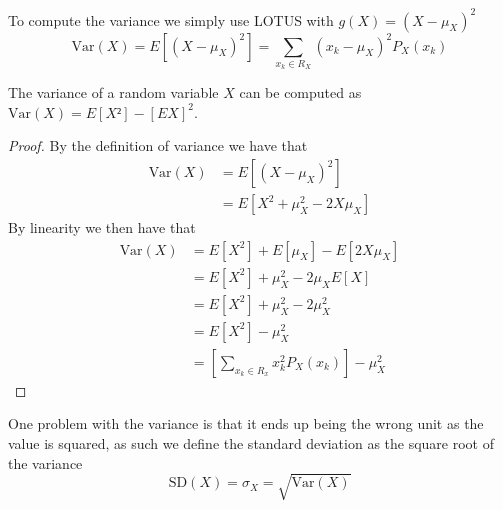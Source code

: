 To compute the variance we simply use LOTUS with $g(X)=(X-\mu_{X})^{2}$
\[
    \text{Var}(X)=E[(X-\mu_{X})^{2}]=\sum_{x_{k}\in R_{X}}(x_{k}-\mu_{X})^{2}P_{X}(x_{k})
\]
\begin{theorem}
    The variance of a random variable $X$ can be computed as $\text{Var}(X)=E[X² ]-[EX]^{2}$.
\end{theorem}
\begin{proof}
    By the definition of variance we have that
    \begin{align*}
        \text{Var}(X)&=E[(X-\mu_{X})^{2}] \\
                 &=E[X^{2}+\mu_{X}^{2}-2X\mu_{X}]
    \end{align*}
    By linearity we then have that
    \begin{align*}
        \text{Var}(X)&=E[X^{2}]+E[\mu_{X}]-E[2X\mu_{X}] \\
                 &=E[X^{2}]+\mu_{X}^{2}-2\mu_{X}E[X] \\
                 &=E[X^{2}]+\mu_{X}^{2}-2\mu_{X}^{2} \\
                 &=E[X^{2}]-\mu_{X}^{2} \\
                 &=\left[\sum_{x_{k}\in R_{x}}x_{k}^{2}P_{X}(x_{k})\right]-\mu_{X}^{2}
    \end{align*}
\end{proof}
One problem with the variance is that it ends up being the wrong unit as the value is squared, as such we define the standard deviation as the square root of the variance
\[
    \text{SD}(X)=\sigma_{X}=\sqrt{\text{Var}(X)}
\]
